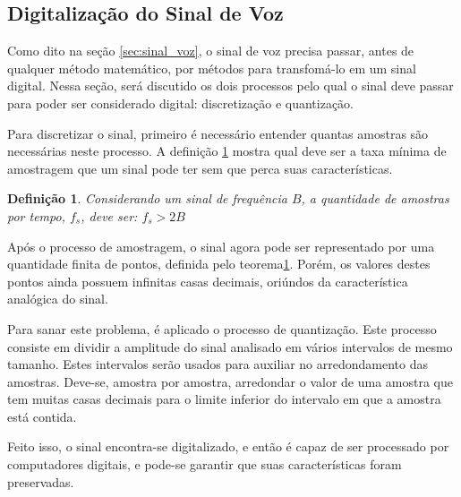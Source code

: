 \documentclass[a4paper,12pt,oneside]{report}
\newtheorem{theorem_nyquist}{Defini\c{c}\~{a}o}
\begin{document}
\subsection{Digitaliza\c{c}\~{a}o do Sinal de Voz}
\label{subsec:digitalizacao_voz}
\par Como dito na se\c{c}\~{a}o \ref{sec:sinal_voz}, o sinal de voz precisa passar, antes de qualquer m\'{e}todo matem\'{a}tico, por m\'{e}todos para transfom\'{a}-lo em um sinal digital. Nessa se\c{c}\~{a}o, ser\'{a} discutido os dois processos pelo qual o sinal deve passar para poder ser considerado digital: discretiza\c{c}\~{a}o e quantiza\c{c}\~{a}o.
\\
\par Para discretizar o sinal, primeiro \'{e} necess\'{a}rio entender quantas amostras s\~{a}o necess\'{a}rias neste processo. A defini\c{c}\~{a}o \ref{shannon_nyquist_definition} mostra qual deve ser a taxa m\'{i}nima de amostragem que um sinal pode ter sem que perca suas caracter\'{i}sticas.
\begin{theorem_nyquist}
\label{shannon_nyquist_definition}
Considerando um sinal de frequ\^{e}ncia $B$, a quantidade de amostras por tempo, $f_s$, deve ser:
\null\hfill$f_s > 2B $\hfill \cite{definicao_taxa_amostragem1}\cite{definicao_taxa_amostragem2}
\end{theorem_nyquist}
\par Ap\'{o}s o processo de amostragem, o sinal agora pode ser representado por uma quantidade finita de pontos, definida pelo teorema\ref{shannon_nyquist_definition}. Por\'{e}m, os valores destes pontos ainda possuem infinitas casas decimais, ori\'{u}ndos da caracter\'{i}stica anal\'{o}gica do sinal. 
\\
\par Para sanar este problema, \'{e} aplicado o processo de quantiza\c{c}\~{a}o. Este processo consiste em dividir a amplitude do sinal analisado em v\'{a}rios intervalos de mesmo tamanho. Estes intervalos ser\~{a}o usados para auxiliar no arredondamento das amostras. Deve-se, amostra por amostra, arredondar o valor de uma amostra que tem muitas casas decimais para o limite inferior do intervalo em que a amostra est\'{a} contida.
\\
\par Feito isso, o sinal encontra-se digitalizado, e ent\~{a}o \'{e} capaz de ser processado por computadores digitais, e pode-se garantir que suas caracter\'{i}sticas foram preservadas.
\end{document}
